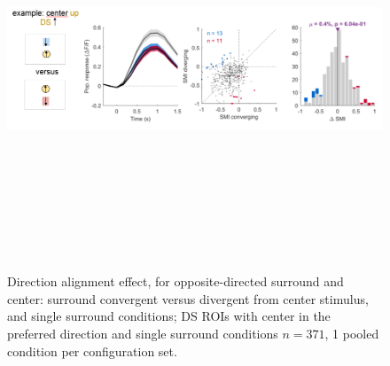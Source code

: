 \begin{figure}[H] \centering \includegraphics[width=12cm,height=12cm,keepaspectratio]{Figures/7.Results/finalPopulation/sel/diagrams/22.png} 
\caption{Direction alignment effect, for opposite-directed surround and center: surround convergent versus divergent from center stimulus, and single surround conditions; DS ROIs with center in the preferred direction and single surround conditions $n=371$, 1 pooled condition per configuration set.} \label{22}
\end{figure}

% 
%    
%           
%
%        

